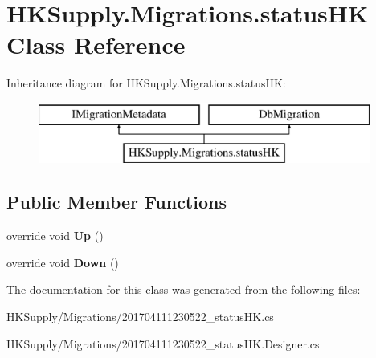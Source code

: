 \hypertarget{class_h_k_supply_1_1_migrations_1_1status_h_k}{}\section{H\+K\+Supply.\+Migrations.\+status\+HK Class Reference}
\label{class_h_k_supply_1_1_migrations_1_1status_h_k}
Inheritance diagram for H\+K\+Supply.\+Migrations.\+status\+HK\+:\begin{figure}[H]
\begin{center}
\leavevmode
\includegraphics[height=2.000000cm]{class_h_k_supply_1_1_migrations_1_1status_h_k}
\end{center}
\end{figure}
\subsection*{Public Member Functions}
\begin{DoxyCompactItemize}
\item 
\mbox{\label{class_h_k_supply_1_1_migrations_1_1status_h_k_a2b8231754f4f00d8ac996d598ddbbe8c}} 
override void {\bfseries Up} ()
\item 
\mbox{\label{class_h_k_supply_1_1_migrations_1_1status_h_k_ad0f4834c4b56ad242285d03675772d1d}} 
override void {\bfseries Down} ()
\end{DoxyCompactItemize}


The documentation for this class was generated from the following files\+:\begin{DoxyCompactItemize}
\item 
H\+K\+Supply/\+Migrations/201704111230522\+\_\+status\+H\+K.\+cs\item 
H\+K\+Supply/\+Migrations/201704111230522\+\_\+status\+H\+K.\+Designer.\+cs\end{DoxyCompactItemize}
